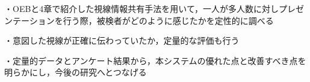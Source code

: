 ・OEBと4章で紹介した視線情報共有手法を用いて，一人が多人数に対しプレゼンテーションを行う際，被検者がどのように感じたかを定性的に調べる

・意図した視線が正確に伝わっていたか，定量的な評価も行う

・定量的データとアンケート結果から，本システムの優れた点と改善すべき点を明らかにし，今後の研究へとつなげる